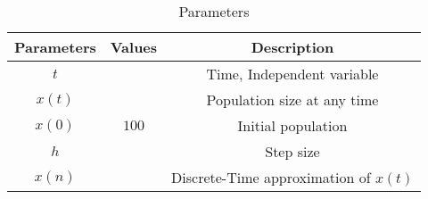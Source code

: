 \begin{table}[htbp]
    \centering
    \begin{tabular}{|c|c|c|} \hline
      \textbf{Parameters} & \textbf{Values} & \textbf{Description} \\ \hline
      $t$ &  & Time, Independent variable \\ \hline
      $x(t)$ &  & Population size at any time \\ \hline
      $x(0)$ & $100$ & Initial population \\ \hline
      $h$ &  & Step size \\ \hline
      $x(n)$ &  & Discrete-Time approximation of $x(t)$ \\ \hline
    \end{tabular}
    \vspace{3pt}
    \caption{Parameters}
    \label{tab:x}
\end{table}
